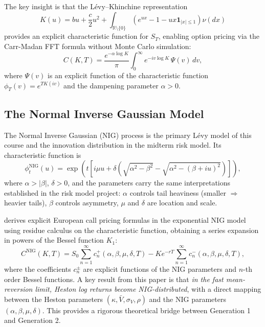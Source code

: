 \documentclass[12pt, a4paper]{article}
\begin{document}
The key insight is that the L\'{e}vy--Khinchine representation
\citep{papapantoleon2008}
\begin{equation}
  K(u) = bu + \frac{c}{2}u^2
  + \int_{\mathbb{R}\setminus\{0\}}
    \!\left(e^{ux} - 1 - ux\mathbf{1}_{|x|\le 1}\right)\nu(dx)
  \label{eq:lk}
\end{equation}
provides an explicit characteristic function for $S_T$, enabling
option pricing via the Carr-Madan FFT formula \citep{carr1999fft}
without Monte Carlo simulation:
\begin{equation}
  C(K,T) = \frac{e^{-\alpha\log K}}{\pi}
  \int_0^\infty e^{-iv\log K}\,\Psi(v)\,dv,
  \label{eq:cm}
\end{equation}
where $\Psi(v)$ is an explicit function of the characteristic function
$\phi_T(v) = e^{TK(iv)}$ and the dampening parameter $\alpha > 0$.

\subsection{The Normal Inverse Gaussian Model}

The Normal Inverse Gaussian (NIG) process \citep{barndorff1997} is the
primary L\'{e}vy model of this course and the innovation distribution
in the midterm risk model. Its characteristic function is
\begin{equation}
  \phi_t^{\mathrm{NIG}}(u) =
  \exp\!\left(t\left[i\mu u + \delta\left(
    \sqrt{\alpha^2 - \beta^2}
    - \sqrt{\alpha^2 - (\beta+iu)^2}
  \right)\right]\right),
  \label{eq:nig_cf}
\end{equation}
where $\alpha > |\beta|$, $\delta > 0$, and the parameters carry
the same interpretations established in the risk model project:
$\alpha$ controls tail heaviness (smaller $\Rightarrow$ heavier tails),
$\beta$ controls asymmetry, $\mu$ and $\delta$ are location and scale.

\citet{aguilar2020} derives explicit European call pricing formulas in
the exponential NIG model using residue calculus on the characteristic
function, obtaining a series expansion in powers of the Bessel function
$K_1$:
\begin{equation}
  C^{\mathrm{NIG}}(K,T) = S_0\sum_{n=1}^{\infty} c_n^+(\alpha,\beta,\mu,\delta,T)
  - K e^{-rT}\sum_{n=1}^{\infty} c_n^-(\alpha,\beta,\mu,\delta,T),
  \label{eq:nig_price}
\end{equation}
where the coefficients $c_n^\pm$ are explicit functions of the NIG
parameters and $n$-th order Bessel functions. A key result from this
paper is that \emph{in the fast mean-reversion limit, Heston log returns
become NIG-distributed}, with a direct mapping between the Heston
parameters $(\kappa, \bar{V}, \sigma_V, \rho)$ and the NIG parameters
$(\alpha, \beta, \mu, \delta)$. This provides a rigorous theoretical
bridge between Generation 1 and Generation 2.
\end{document}
